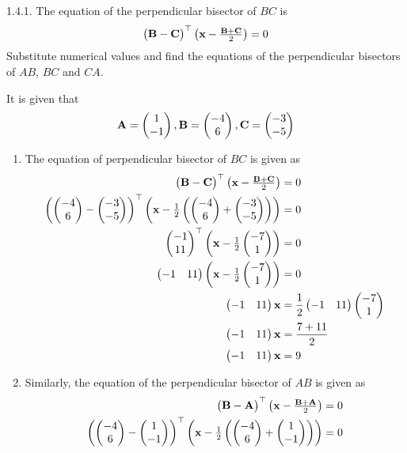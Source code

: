 \documentclass[]{article}
\begin{document}
\let\vec\mathbf

1.4.1. The equation of the perpendicular bisector of $BC$ is
\begin{align}
{\myvec{\vec{B}-\vec{C}}}^\top \myvec{\vec{x} - \frac{\vec{B}+\vec{C}}{2}} = 0
\end{align}
Substitute numerical values and find the equations of the perpendicular bisectors of $AB$, $BC$ and $CA$.

\solution
It is given that
\begin{align}
\vec{A} = \myvec{1\\-1}, \vec{B}=\myvec{-4\\6}, \vec{C}=\myvec{-3\\-5}
\end{align}
\begin{enumerate} 
\item {The equation of perpendicular bisector of $BC$ is given as
\begin{align}
{\myvec{\vec{B}-\vec{C}}}^\top \myvec{\vec{x} - \frac{\vec{B}+\vec{C}}{2}} &= 0 \\
{\myvec{\myvec{-4\\6}-\myvec{-3\\-5}}}^\top \myvec{\vec{x} - \frac{1}{2} \myvec{\myvec{-4\\6}+\myvec{-3\\-5}}  } &= 0 \\
{\myvec{-1\\11}}^\top \myvec{\vec{x} - \frac{1}{2}\myvec{-7\\1}} &= 0\\
\myvec{-1&11} \myvec{\vec{x} - \frac{1}{2}\myvec{-7\\1}} &= 0\\
\myvec{-1&11}\vec{x} &= \frac{1}{2}\myvec{-1&11}\myvec{-7\\1}\\
\myvec{-1&11}\vec{x} &= \frac{7+11}{2}\\
\myvec{-1&11}\vec{x} &= 9
\end{align}}
\item {Similarly, the equation of the perpendicular bisector of $AB$ is given as
\begin{align}
{\myvec{\vec{B}-\vec{A}}}^\top \myvec{\vec{x} - \frac{\vec{B}+\vec{A}}{2}} &= 0 \\
{\myvec{\myvec{-4\\6}-\myvec{1\\-1}}}^\top \myvec{\vec{x} - \frac{1}{2}\myvec{\myvec{-4\\6}+\myvec{1\\-1}}  } &= 0 \\

\end{align}}
\end{enumerate}
\end{document}
